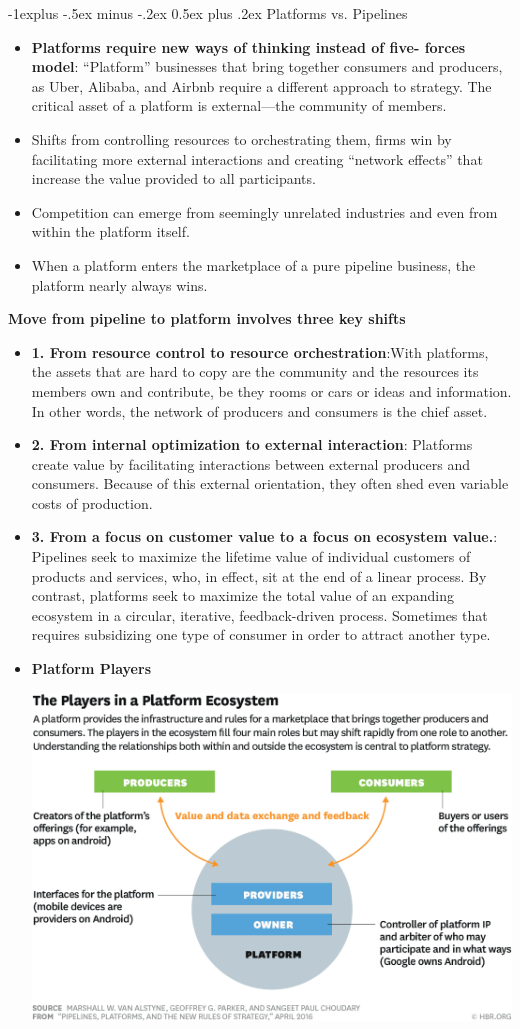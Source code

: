 \documentclass[12pt, landscape]{article}
\makeatletter
\renewcommand{\subsection}{\@startsection{subsection}{2}{0mm}%
                                {-1explus -.5ex minus -.2ex}%
                                {0.5ex plus .2ex}%
                                {\normalfont\normalsize\bfseries}}
\makeatother
\begin{document}
\begin{multicols*}{3}
\subsection{Platforms vs. Pipelines}
\begin{itemize}
\item \textbf{Platforms require new ways of thinking instead of five- forces model}: “Platform” businesses that bring together consumers and producers, as Uber, Alibaba, and Airbnb require a different approach to strategy. The critical asset of a platform is external—the community of members. 
\item Shifts from controlling resources to orchestrating them, firms win by facilitating more external interactions and creating “network effects” that increase the value provided to all participants.
\item Competition can emerge from seemingly unrelated industries and even from within the platform itself.
\item When a platform enters the marketplace of a pure pipeline business, the platform nearly always wins. 
\end{itemize}
\textbf{Move from pipeline to platform involves three key shifts}
\begin{itemize}
\item \textbf{1. From resource control to resource orchestration}:With platforms, the assets that are hard to copy are the community and the resources its members own and contribute, be they rooms or cars or ideas and information. In other words, the network of producers and consumers is the chief asset.
\item \textbf{2. From internal optimization to external interaction}: Platforms create value by facilitating interactions between external producers and consumers. Because of this external orientation, they often shed even variable costs of production. 
\item \textbf{3. From a focus on customer value to a focus on ecosystem value.}: Pipelines seek to maximize the lifetime value of individual customers of products and services, who, in effect, sit at the end of a linear process. By contrast, platforms seek to maximize the total value of an expanding ecosystem in a circular, iterative, feedback-driven process. Sometimes that requires subsidizing one type of consumer in order to attract another type.
\item \textbf{Platform Players}
\centerline{\includegraphics[width = 0.8\linewidth]{platformPlayers}}

\end{itemize}
\end{multicols*}
\end{document}
